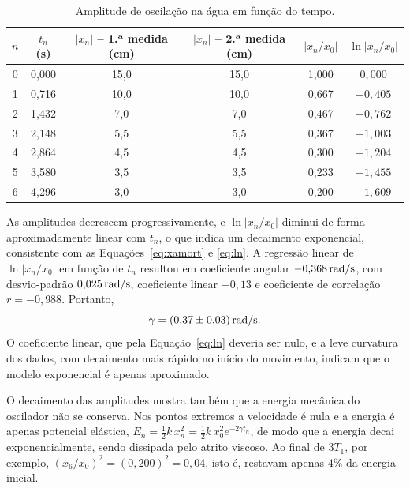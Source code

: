 \begin{table}[H]
\centering
\caption{Amplitude de oscilação na água em função do tempo.}
\label{tab:decaimento}
\begin{tabular}{cccccc}
\toprule
$n$ & $t_n$ (s) & $|x_n|$ -- 1.ª medida (cm) & $|x_n|$ -- 2.ª medida (cm) & $|x_n/x_0|$ & $\ln|x_n/x_0|$ \\
\midrule
0 & 0,000 & 15,0 & 15,0 & 1,000 & $0{,}000$ \\
1 & 0,716 & 10,0 & 10,0 & 0,667 & $-0{,}405$ \\
2 & 1,432 & 7,0 & 7,0 & 0,467 & $-0{,}762$ \\
3 & 2,148 & 5,5 & 5,5 & 0,367 & $-1{,}003$ \\
4 & 2,864 & 4,5 & 4,5 & 0,300 & $-1{,}204$ \\
5 & 3,580 & 3,5 & 3,5 & 0,233 & $-1{,}455$ \\
6 & 4,296 & 3,0 & 3,0 & 0,200 & $-1{,}609$ \\
\bottomrule
\end{tabular}
\end{table}

As amplitudes decrescem progressivamente, e $\ln|x_n/x_0|$ diminui de forma aproximadamente linear com $t_n$, o que indica um decaimento exponencial, consistente com as Equações~\eqref{eq:xamort} e \eqref{eq:ln}. A regressão linear de $\ln|x_n/x_0|$ em função de $t_n$ resultou em coeficiente angular $-0{,}368\,\mathrm{rad/s}$, com desvio-padrão $0{,}025\,\mathrm{rad/s}$, coeficiente linear $-0{,}13$ e coeficiente de correlação $r=-0{,}988$. Portanto,
\[
\gamma=(0{,}37\pm0{,}03)\,\mathrm{rad/s}.
\]
O coeficiente linear, que pela Equação~\eqref{eq:ln} deveria ser nulo, e a leve curvatura dos dados, com decaimento mais rápido no início do movimento, indicam que o modelo exponencial é apenas aproximado.

O decaimento das amplitudes mostra também que a energia mecânica do oscilador não se conserva. Nos pontos extremos a velocidade é nula e a energia é apenas potencial elástica, $E_n=\frac{1}{2}k\,x_n^2=\frac{1}{2}k\,x_0^2e^{-2\gamma t_n}$, de modo que a energia decai exponencialmente, sendo dissipada pelo atrito viscoso. Ao final de $3T_1$, por exemplo, $(x_6/x_0)^2=(0{,}200)^2=0{,}04$, isto é, restavam apenas $4\%$ da energia inicial.

